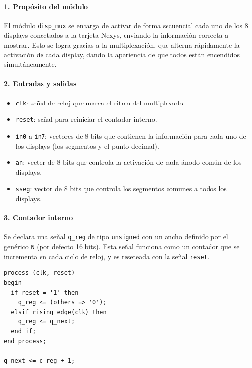 \documentclass[a4paper,12pt]{article}
\begin{document}
\paragraph{1. Propósito del módulo}

El módulo \texttt{disp\_mux} se encarga de activar de forma secuencial cada uno de los 8 displays conectados a la tarjeta Nexys, enviando la información correcta a mostrar.  
Esto se logra gracias a la multiplexación, que alterna rápidamente la activación de cada display, dando la apariencia de que todos están encendidos simultáneamente.

\paragraph{2. Entradas y salidas}

\begin{itemize}
  \item \texttt{clk}: señal de reloj que marca el ritmo del multiplexado.
  \item \texttt{reset}: señal para reiniciar el contador interno.
  \item \texttt{in0} a \texttt{in7}: vectores de 8 bits que contienen la información para cada uno de los displays (los segmentos y el punto decimal).
  \item \texttt{an}: vector de 8 bits que controla la activación de cada ánodo común de los displays.
  \item \texttt{sseg}: vector de 8 bits que controla los segmentos comunes a todos los displays.
\end{itemize}

\paragraph{3. Contador interno}

Se declara una señal \texttt{q\_reg} de tipo \texttt{unsigned} con un ancho definido por el genérico \texttt{N} (por defecto 16 bits).  
Esta señal funciona como un contador que se incrementa en cada ciclo de reloj, y es reseteada con la señal \texttt{reset}.

\begin{lstlisting}[basicstyle=\ttfamily\footnotesize]
process (clk, reset)
begin
  if reset = '1' then
    q_reg <= (others => '0');
  elsif rising_edge(clk) then
    q_reg <= q_next;
  end if;
end process;

q_next <= q_reg + 1;
\end{lstlisting}
\end{document}
